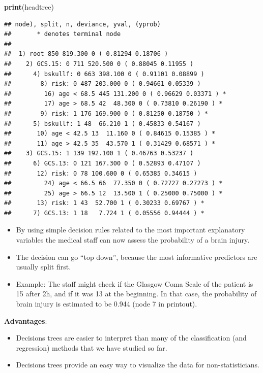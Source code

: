 \documentclass[10pt,ignorenonframetext,]{beamer}
\newenvironment{Shaded}{\begin{snugshade}}{\end{snugshade}}
\newcommand{\KeywordTok}[1]{\textcolor[rgb]{0.13,0.29,0.53}{\textbf{#1}}}
\newcommand{\NormalTok}[1]{#1}
\begin{document}
\begin{frame}[fragile]

\footnotesize

\begin{Shaded}
\begin{Highlighting}[]
\KeywordTok{print}\NormalTok{(headtree)}
\end{Highlighting}
\end{Shaded}

\begin{verbatim}
## node), split, n, deviance, yval, (yprob)
##       * denotes terminal node
## 
##  1) root 850 819.300 0 ( 0.81294 0.18706 )  
##    2) GCS.15: 0 711 520.500 0 ( 0.88045 0.11955 )  
##      4) bskullf: 0 663 398.100 0 ( 0.91101 0.08899 )  
##        8) risk: 0 487 203.000 0 ( 0.94661 0.05339 )  
##         16) age < 68.5 445 131.200 0 ( 0.96629 0.03371 ) *
##         17) age > 68.5 42  48.300 0 ( 0.73810 0.26190 ) *
##        9) risk: 1 176 169.900 0 ( 0.81250 0.18750 ) *
##      5) bskullf: 1 48  66.210 1 ( 0.45833 0.54167 )  
##       10) age < 42.5 13  11.160 0 ( 0.84615 0.15385 ) *
##       11) age > 42.5 35  43.570 1 ( 0.31429 0.68571 ) *
##    3) GCS.15: 1 139 192.100 1 ( 0.46763 0.53237 )  
##      6) GCS.13: 0 121 167.300 0 ( 0.52893 0.47107 )  
##       12) risk: 0 78 100.600 0 ( 0.65385 0.34615 )  
##         24) age < 66.5 66  77.350 0 ( 0.72727 0.27273 ) *
##         25) age > 66.5 12  13.500 1 ( 0.25000 0.75000 ) *
##       13) risk: 1 43  52.700 1 ( 0.30233 0.69767 ) *
##      7) GCS.13: 1 18   7.724 1 ( 0.05556 0.94444 ) *
\end{verbatim}

\normalsize

\end{frame}

\begin{frame}

\begin{itemize}
\item
  By using simple decision rules related to the most important
  explanatory variables the medical staff can now assess the probability
  of a brain injury.
\item
  The decision can go ``top down'', because the most informative
  predictors are usually split first.
\item
  Example: The staff might check if the Glasgow Coma Scale of the
  patient is 15 after 2h, and if it was 13 at the beginning. In that
  case, the probability of brain injury is estimated to be 0.944 (node 7
  in printout).
\end{itemize}

\textbf{Advantages}:

\begin{itemize}
\item
  Decisions trees are easier to interpret than many of the
  classification (and regression) methods that we have studied so far.
\item
  Decisions trees provide an easy way to visualize the data for
  non-statisticians.
\end{itemize}

\end{frame}
\end{document}
